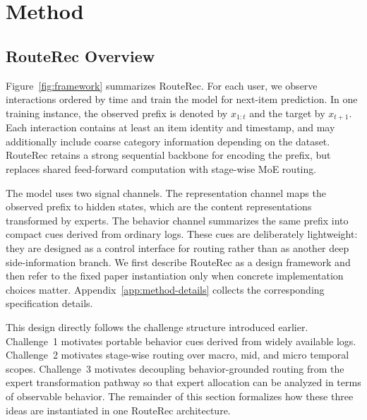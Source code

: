 \documentclass[sigconf,review,anonymous]{acmart}
\begin{document}
\section{Method}
\label{sec:method}

\subsection{RouteRec Overview}
\label{sec:problem-framework}

Figure~\ref{fig:framework} summarizes RouteRec. For each user, we observe interactions ordered by time and train the model for next-item prediction. In one training instance, the observed prefix is denoted by $x_{1:t}$ and the target by $x_{t+1}$. Each interaction contains at least an item identity and timestamp, and may additionally include coarse category information depending on the dataset. RouteRec retains a strong sequential backbone for encoding the prefix, but replaces shared feed-forward computation with stage-wise MoE routing.

The model uses two signal channels. The representation channel maps the observed prefix to hidden states, which are the content representations transformed by experts. The behavior channel summarizes the same prefix into compact cues derived from ordinary logs. These cues are deliberately lightweight: they are designed as a control interface for routing rather than as another deep side-information branch. We first describe RouteRec as a design framework and then refer to the fixed paper instantiation only when concrete implementation choices matter. Appendix~\ref{app:method-details} collects the corresponding specification details.

This design directly follows the challenge structure introduced earlier. Challenge~1 motivates portable behavior cues derived from widely available logs. Challenge~2 motivates stage-wise routing over macro, mid, and micro temporal scopes. Challenge~3 motivates decoupling behavior-grounded routing from the expert transformation pathway so that expert allocation can be analyzed in terms of observable behavior. The remainder of this section formalizes how these three ideas are instantiated in one RouteRec architecture.
\end{document}
